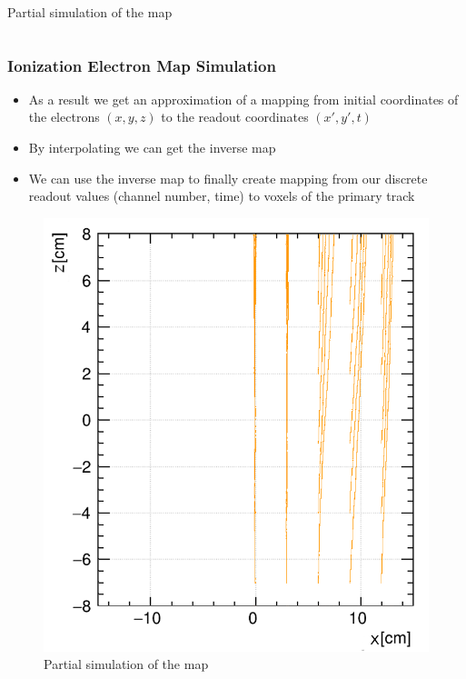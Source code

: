 \documentclass{beamer}
\begin{document}
\begin{frame}
\begin{columns}
\begin{minipage}[t][4.2cm]{\textwidth}
				\end{minipage}
				{Partial simulation of the map}
		\end{columns}
	\end{frame}

	\begin{frame}
		\frametitle{Ionization Electron Map Simulation}
		\begin{itemize}
			\item As a result we get an approximation of a mapping from initial coordinates of the electrons $(x,y,z)$ to the readout coordinates $(x',y',t)$
			\item By interpolating we can get the inverse map
			\item We can use the inverse map to finally create mapping from our discrete readout values (channel number, time) to voxels of the primary track
		\end{itemize}
		\begin{figure}
			\centering
			\includegraphics[height=0.4\textheight]{../images/map_lines_flipped.png}\\
			\small{Partial simulation of the map}
		\end{figure}
	\end{frame}
\end{document}
